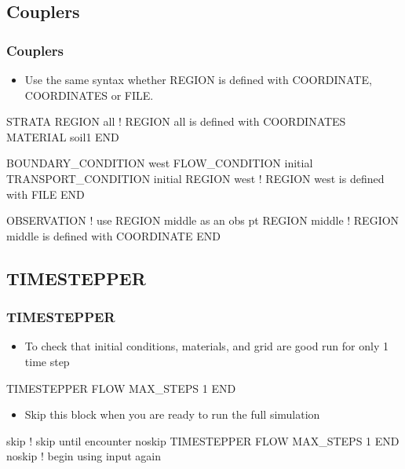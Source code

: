 \documentclass{beamer}
\newcommand\bluecomment[1]{{{\color{blue} #1}}}
\newcommand\greencomment[1]{{{\color{green} #1}}}
\begin{document}
\subsection{Couplers}

\begin{frame}[fragile]\frametitle{Couplers}

\begin{itemize}
\item Use the same syntax whether REGION is defined with COORDINATE, COORDINATES or FILE.
\end{itemize}

\begin{semiverbatim}

STRATA
  REGION all \bluecomment{! REGION \greencomment{all} is defined with COORDINATES}
  MATERIAL soil1
END

BOUNDARY_CONDITION west
  FLOW_CONDITION initial
  TRANSPORT_CONDITION initial
  REGION west \bluecomment{! REGION \greencomment{west} is defined with FILE}
END

OBSERVATION \bluecomment{! use REGION \greencomment{middle} as an obs pt}
  REGION middle \bluecomment{! REGION \greencomment{middle} is defined with COORDINATE}
END
\end{semiverbatim}

\end{frame}

\subsection{TIMESTEPPER}

\begin{frame}[fragile]\frametitle{TIMESTEPPER}

\begin{itemize}
\item To check that initial conditions, materials, and grid are good run for only 1 time step
\end{itemize}

\begin{semiverbatim}

TIMESTEPPER FLOW
  MAX_STEPS 1
END
\end{semiverbatim}

\begin{itemize}
\item Skip this block when you are ready to run the full simulation
\end{itemize}

\begin{semiverbatim}

skip \bluecomment{! \greencomment{skip} until encounter \greencomment{noskip}}
TIMESTEPPER FLOW
  MAX_STEPS 1
END
noskip \bluecomment{! begin using input again}
\end{semiverbatim}

\end{frame}
\end{document}
